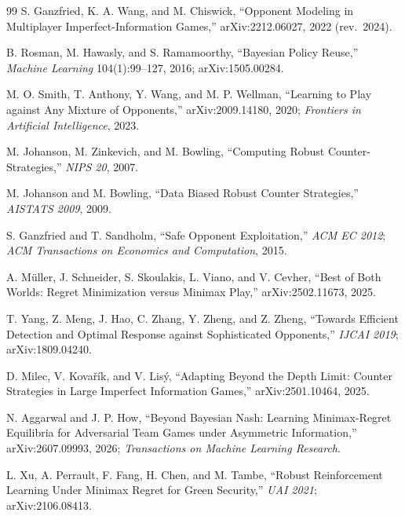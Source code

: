 \documentclass[11pt]{article}
\theoremstyle{definition}
\begin{document}
\begin{thebibliography}{99}
S. Ganzfried, K. A. Wang, and M. Chiswick, ``Opponent Modeling in Multiplayer
Imperfect-Information Games,'' arXiv:2212.06027, 2022 (rev.\ 2024).

B. Rosman, M. Hawasly, and S. Ramamoorthy, ``Bayesian Policy Reuse,''
\emph{Machine Learning} 104(1):99--127, 2016; arXiv:1505.00284.

M. O. Smith, T. Anthony, Y. Wang, and M. P. Wellman, ``Learning to Play against
Any Mixture of Opponents,'' arXiv:2009.14180, 2020; \emph{Frontiers in Artificial
Intelligence}, 2023.

M. Johanson, M. Zinkevich, and M. Bowling, ``Computing Robust
Counter-Strategies,'' \emph{NIPS 20}, 2007.

M. Johanson and M. Bowling, ``Data Biased Robust Counter Strategies,''
\emph{AISTATS 2009}, 2009.

S. Ganzfried and T. Sandholm, ``Safe Opponent Exploitation,'' \emph{ACM EC 2012};
\emph{ACM Transactions on Economics and Computation}, 2015.

A. M\"uller, J. Schneider, S. Skoulakis, L. Viano, and V. Cevher, ``Best of Both
Worlds: Regret Minimization versus Minimax Play,'' arXiv:2502.11673, 2025.

T. Yang, Z. Meng, J. Hao, C. Zhang, Y. Zheng, and Z. Zheng, ``Towards Efficient
Detection and Optimal Response against Sophisticated Opponents,'' \emph{IJCAI
2019}; arXiv:1809.04240.

D. Milec, V. Kova\v{r}\'ik, and V. Lis\'y, ``Adapting Beyond the Depth Limit:
Counter Strategies in Large Imperfect Information Games,'' arXiv:2501.10464,
2025.


N. Aggarwal and J. P. How, ``Beyond Bayesian Nash: Learning Minimax-Regret
Equilibria for Adversarial Team Games under Asymmetric Information,''
arXiv:2607.09993, 2026; \emph{Transactions on Machine Learning Research}.

L. Xu, A. Perrault, F. Fang, H. Chen, and M. Tambe, ``Robust Reinforcement
Learning Under Minimax Regret for Green Security,'' \emph{UAI 2021};
arXiv:2106.08413.


\end{thebibliography}
\end{document}
